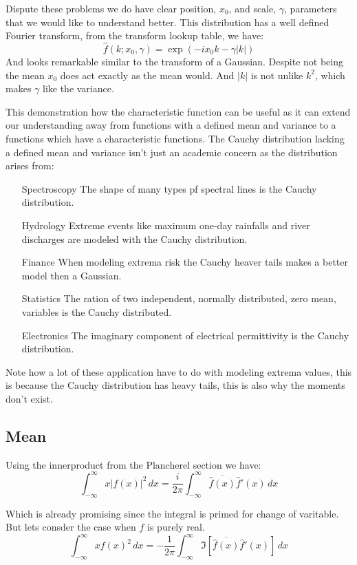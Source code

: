 Dispute these problems we do have clear position, $x_0$, and scale, $\gamma$, parameters that we would like to understand better.
This distribution has a well defined Fourier transform, from the transform lookup table, we have:
\[\hat{f}(k;x_0,\gamma) = \exp(-ix_0k-\gamma|k|)\]
And looks remarkable similar to the transform of a Gaussian.
Despite not being the mean $x_0$ does act exactly as the mean would.
And $|k|$ is not unlike $k^2$, which makes $\gamma$ like the variance.

This demonstration how the characteristic function can be useful as it can extend our understanding away from functions with a defined mean and variance to a functions which have a characteristic functions.
The Cauchy distribution lacking a defined mean and variance isn't just an academic concern as the distribution arises from:
\begin{enumerate}
\item[Spectroscopy] The shape of many types pf spectral lines is the Cauchy distribution.
\item[Hydrology] Extreme events like maximum one-day rainfalls and river discharges are modeled with the Cauchy distribution.
\item[Finance] When modeling extrema risk the Cauchy heaver tails makes a better model then a Gaussian.
\item[Statistics] The ration of two independent, normally distributed, zero mean, variables is the Cauchy distributed.
\item[Electronics] The imaginary component of electrical permittivity is the Cauchy distribution.
\end{enumerate}

Note how a lot of these application have to do with modeling extrema values, this is because the Cauchy distribution has heavy tails, this is also why the moments don't exist.

\subsection{Mean}
Using the innerproduct from the Plancherel section we have:
\[\int_{-\infty}^{\infty}x|f(x)|^2\,dx = \frac{i}{2\pi}\int_{-\infty}^{\infty}\overline{\hat{f}(x)}\hat{f}'(x)\,dx\]

Which is already promising since the integral is primed for change of varitable.
But lets consder the case when $f$ is purely real.
\[\int_{-\infty}^{\infty}xf(x)^2\,dx = -\frac{1}{2\pi}\int_{-\infty}^{\infty}\Im[\overline{\hat{f}(x)}\hat{f}'(x)]\,dx\]

